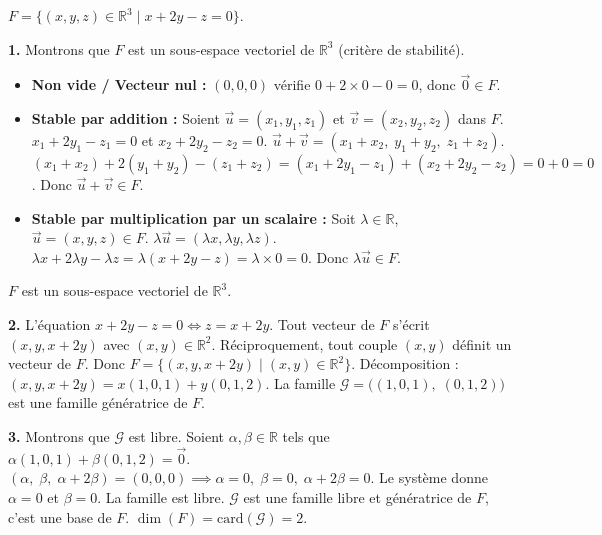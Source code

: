 \documentclass[11pt]{article}
\newcommand{\cle}[1]{{\popxbold\color{popdark}#1}}
\begin{document}
\begin{corrige}
$F=\{(x,y,z)\in\mathbb{R}^3 \mid x+2y-z=0\}$.

\textbf{1.} Montrons que $F$ est un sous-espace vectoriel de $\mathbb{R}^3$ (critère de stabilité).
\begin{itemize}
    \item \textbf{Non vide / Vecteur nul :} $(0,0,0)$ vérifie $0+2\times0-0=0$, donc $\vec{0}\in F$.
    \item \textbf{Stable par addition :} Soient $\vec{u}=(x_1,y_1,z_1)$ et $\vec{v}=(x_2,y_2,z_2)$ dans $F$.
    $x_1+2y_1-z_1=0$ et $x_2+2y_2-z_2=0$.
    $\vec{u}+\vec{v} = (x_1+x_2,\; y_1+y_2,\; z_1+z_2)$.
    $(x_1+x_2)+2(y_1+y_2)-(z_1+z_2) = (x_1+2y_1-z_1)+(x_2+2y_2-z_2)=0+0=0$.
    Donc $\vec{u}+\vec{v}\in F$.
    \item \textbf{Stable par multiplication par un scalaire :} Soit $\lambda\in\mathbb{R}$, $\vec{u}=(x,y,z)\in F$.
    $\lambda\vec{u}=(\lambda x,\lambda y,\lambda z)$.
    $\lambda x + 2\lambda y - \lambda z = \lambda(x+2y-z)=\lambda\times0=0$.
    Donc $\lambda\vec{u}\in F$.
\end{itemize}
$F$ est un sous-espace vectoriel de $\mathbb{R}^3$.

\textbf{2.} L'équation $x+2y-z=0 \iff z = x+2y$.
Tout vecteur de $F$ s'écrit $(x,y,x+2y)$ avec $(x,y)\in\mathbb{R}^2$.
Réciproquement, tout couple $(x,y)$ définit un vecteur de $F$.
Donc $F = \{(x,y,x+2y) \mid (x,y)\in\mathbb{R}^2\}$.
Décomposition : $(x,y,x+2y) = x(1,0,1) + y(0,1,2)$.
La famille $\mathcal{G} = \big((1,0,1),\;(0,1,2)\big)$ est une \cle{famille génératrice} de $F$.

\textbf{3.} Montrons que $\mathcal{G}$ est \cle{libre}.
Soient $\alpha,\beta\in\mathbb{R}$ tels que $\alpha(1,0,1)+\beta(0,1,2)=\vec{0}$.
$(\alpha,\;\beta,\;\alpha+2\beta) = (0,0,0) \implies \alpha=0,\; \beta=0,\; \alpha+2\beta=0$.
Le système donne $\alpha=0$ et $\beta=0$. La famille est libre.
$\mathcal{G}$ est une famille libre et génératrice de $F$, c'est une \cle{base} de $F$.
$\dim(F) = \text{card}(\mathcal{G}) = 2$.
\end{corrige}
\end{document}
